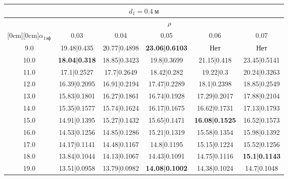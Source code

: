 \documentclass[20pt]{article}
\begin{document}
\begin{center}
\begin{tabular}{c|ccccc}
\hline
	\multicolumn{6}{c}{$d_{1}=0.4 \ м$} \\
\hline
	 & \multicolumn{5}{|c}{$\rho$} \\
	\cline{2-6}
	\raisebox{1.5ex}[0cm][0cm]{$\alpha_{1эф}$} & 0.03 & 0.04 & 0.05 & 0.06 & 0.07\\
\hline
	9.0 & 	19.48|0.435 & 	20.77|0.4898 & 	\textbf{23.06|0.6103} & 	Нет & 	Нет\\
	10.0 & 	\textbf{18.04|0.318} & 	18.85|0.3423 & 	19.8|0.3699 & 	21.15|0.418 & 	23.45|0.5141\\
	11.0 & 	17.1|0.2527 & 	17.7|0.2649 & 	18.42|0.282 & 	19.22|0.3 & 	20.24|0.3263\\
	12.0 & 	16.39|0.2095 & 	16.91|0.2194 & 	17.47|0.2289 & 	18.1|0.2398 & 	18.85|0.2549\\
	13.0 & 	15.83|0.1801 & 	16.27|0.1861 & 	16.74|0.1928 & 	17.29|0.2017 & 	17.88|0.2104\\
	14.0 & 	15.35|0.1577 & 	15.74|0.1624 & 	16.17|0.1675 & 	16.62|0.1731 & 	17.13|0.1793\\
	15.0 & 	14.91|0.1395 & 	15.27|0.1432 & 	15.65|0.1471 & 	\textbf{16.08|0.1525} & 	16.52|0.1573\\
	16.0 & 	14.53|0.1256 & 	14.85|0.1286 & 	15.21|0.1319 & 	15.58|0.1354 & 	15.98|0.1392\\
	17.0 & 	14.17|0.1141 & 	14.48|0.1167 & 	14.8|0.1195 & 	15.15|0.1224 & 	15.52|0.1256\\
	18.0 & 	13.84|0.1044 & 	14.13|0.1067 & 	14.43|0.1091 & 	14.75|0.1116 & 	\textbf{15.1|0.1143}\\
	19.0 & 	13.51|0.0958 & 	13.79|0.0982 & 	\textbf{14.08|0.1002} & 	14.38|0.1024 & 	14.7|0.1048\\
\end{tabular}


\end{center}
\end{document}
